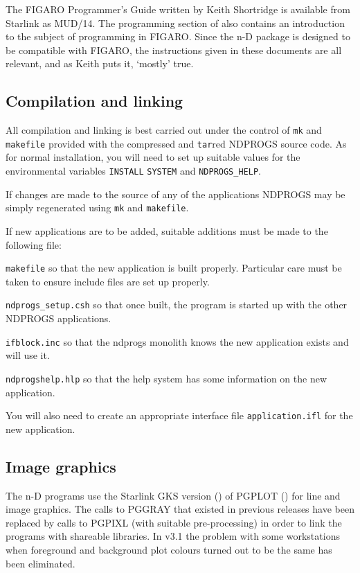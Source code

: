 The FIGARO Programmer's Guide written by Keith Shortridge is available
from Starlink as MUD/14. The programming section of 
 also contains an 
introduction to the subject of programming in FIGARO. Since the n-D package is 
designed to be compatible with FIGARO, the instructions given in these 
documents are all relevant, and as Keith puts it, `mostly' true.


\subsection{Compilation and linking}

All compilation and linking is best carried out under the control of
{\tt mk} and {\tt makefile} provided with the compressed and {\tt tar}red 
NDPROGS source code. As for normal installation, you will need
to set up suitable values for the environmental variables {\tt INSTALL}
{\tt SYSTEM} and {\tt NDPROGS\_HELP}.

If changes are made to the source of any of the 
applications NDPROGS may be simply regenerated using {\tt mk} and {\tt makefile}.

If new applications are to be added, suitable additions must be made to
the following file:

{\tt makefile} so that the new application is built
properly. Particular care must be taken to ensure include files
are set up properly.

{\tt ndprogs\_setup.csh} so that once built, the program is started up with the 
other NDPROGS applications.

{\tt ifblock.inc} so that the ndprogs monolith knows the new application exists
and will use it.

{\tt ndprogshelp.hlp} so that the help system has some information on the new 
application.

You will also need to create an appropriate interface file 
{\tt application.ifl} for 
the new application.


\subsection{Image graphics}
\label{image}

The n-D programs use the Starlink GKS version () of PGPLOT 
() for line and image 
graphics. The calls to PGGRAY that existed in previous releases have been
replaced by calls to PGPIXL (with suitable pre-processing) in order to link
the programs with shareable libraries. In v3.1 the problem with some
workstations when foreground and background plot colours turned out to be the
same has been eliminated.


